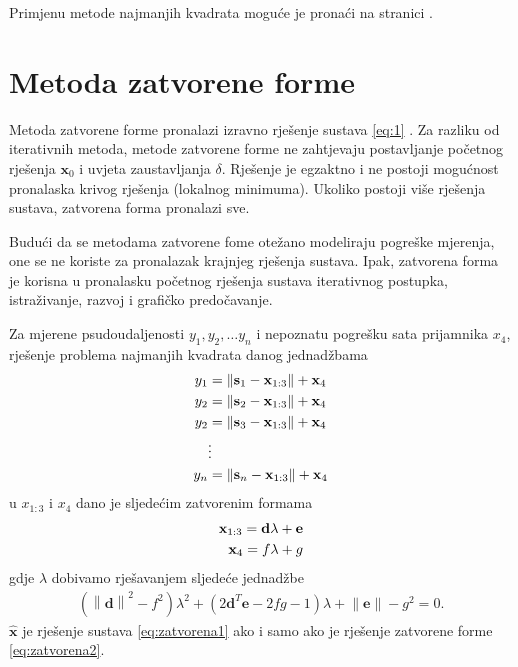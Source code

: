 \documentclass[a4paper,twoside,12pt]{memoir} %
\begin{document}
Primjenu metode najmanjih kvadrata moguće je pronaći na stranici \pageref{stranica:nastavakLS}.

\section{Metoda zatvorene forme}
Metoda zatvorene forme pronalazi izravno rješenje sustava \ref{eq:1} \cite{math:positioning}.
Za razliku od iterativnih metoda,
metode zatvorene forme ne zahtjevaju postavljanje početnog rješenja $\mathbf{x}_0$ i uvjeta zaustavljanja $\delta$. Rješenje je egzaktno i ne postoji mogućnost 
pronalaska krivog rješenja (lokalnog minimuma). Ukoliko postoji više rješenja sustava, 
zatvorena forma pronalazi sve.

Budući da se metodama zatvorene fome otežano modeliraju pogreške mjerenja,
one se ne koriste za pronalazak krajnjeg rješenja sustava.
Ipak,
zatvorena forma je korisna u pronalasku početnog rješenja sustava iterativnog postupka, istraživanje, razvoj i grafičko predočavanje.


Za mjerene psudoudaljenosti $y_1,y_2, \hdots y_n$ i nepoznatu pogrešku sata prijamnika $x_4$, rješenje 
problema najmanjih kvadrata danog jednadžbama
\begin{align}\label{eq:zatvorena1}
y_1 &= \left \| \mathbf{s}_1 - \mathbf{x}_{1:3} \right \| + \mathbf{x}_{4} \notag \\
y_2 &= \left \| \mathbf{s}_2 - \mathbf{x}_{1:3} \right \| + \mathbf{x}_{4} \notag \\
y_2 &= \left \| \mathbf{s}_3 - \mathbf{x}_{1:3} \right \| + \mathbf{x}_{4} \\
&\vdots \notag \\
y_n &= \left \| \mathbf{s}_n - \mathbf{x}_{1:3} \right \| + \mathbf{x}_{4} \notag 
\end{align}
u $x_{1:3}$ i $x_4$ dano je sljedećim zatvorenim formama
\begin{align}\label{eq:zatvorena2}
	\mathbf{x}_{1:3} = \mathbf{d}\lambda + \mathbf{e} \\
	\mathbf{x}_{4} = f\lambda + g \notag
\end{align}
gdje $\lambda$ dobivamo rješavanjem sljedeće jednadžbe
\begin{align}
	( \left \|\mathbf{d}\right \|^2 - f^2 ) \lambda^2 + (2\mathbf{d}^T \mathbf{e} - 2fg - 1)\lambda + \left \|\mathbf{e}\right \| - g^2 = 0.
\end{align}
 $\hat{\mathbf{x}}$ je rješenje sustava \ref{eq:zatvorena1} ako i samo ako je
rješenje zatvorene forme \ref{eq:zatvorena2}.
\end{document}
